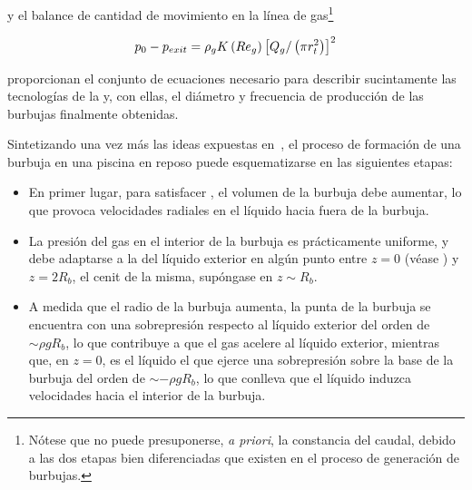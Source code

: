 y el balance de cantidad de movimiento en la línea de gas\footnote{Nótese que no puede presuponerse, \textit{a priori}, la constancia del caudal, debido a las dos etapas bien diferenciadas que existen en el proceso de generación de burbujas.}

\begin{equation}\LABEQ{continuidad}
p_{0} - p_{exit} = \rho_{g}K\left(Re_{g}\right)\left[Q_{g}/\left(\pi r_{t}^{2}\right)\right]^{2}
\end{equation}

proporcionan el conjunto de ecuaciones necesario para describir sucintamente las tecnologías de la  y, con ellas, el diámetro y frecuencia de producción de las burbujas finalmente obtenidas. 

Sintetizando una vez más las ideas expuestas en~\cite{Rodriguez-Rodriguez2015b}, el proceso de formación de una burbuja en una piscina en reposo puede esquematizarse en las siguientes etapas:

\begin{itemize}
\item En primer lugar, para satisfacer , el volumen de la burbuja debe aumentar, lo que provoca velocidades radiales en el líquido hacia fuera de la burbuja. 
\item La presión del gas en el interior de la burbuja es prácticamente uniforme, y debe adaptarse a la del líquido exterior en algún punto entre $z = 0$ (véase ) y $z = 2R_{b}$, el cenit de la misma, supóngase en $z \sim R_{b}$. 
\item A medida que el radio de la burbuja aumenta, la punta de la burbuja se encuentra con una sobrepresión respecto al líquido exterior del orden de $\sim \rho g R_{b}$, lo que contribuye a que el gas acelere al líquido exterior, mientras que, en $z = 0$, es el líquido el que ejerce una sobrepresión sobre la base de la burbuja del orden de $\sim -\rho g R_{b}$, lo que conlleva que el líquido induzca velocidades hacia el interior de la burbuja. 
\end{itemize}

